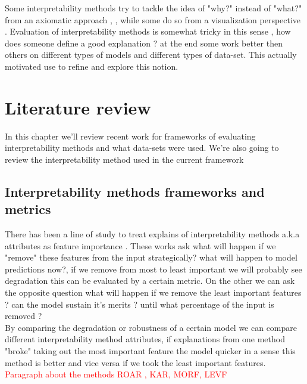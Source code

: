 \documentclass[12pt]{report}
\begin{document}
Some interpretability methods try to tackle the idea of "why?" instead of "what?" from an axiomatic approach 
\cite{DBLP:journals/corr/SundararajanTY17}, \cite{DBLP:journals/corr/abs-2111-07668},  while some do so
from a visualization perspective \cite{DBLP:journals/corr/abs-1802-00614}. Evaluation of interpretability methods is somewhat tricky in this sense , how does someone define a good explanation ? at the end some work better then others on different types of models and different types of data-set. This actually motivated use to refine and explore this notion.  


\newpage

\chapter{Literature review} 

In this chapter we'll review recent work for frameworks of evaluating interpretability methods and what data-sets were used. We're also going to review the interpretability method used in the current framework

\section{Interpretability methods frameworks and metrics}

There has been a line of study to treat explains of interpretability methods a.k.a attributes as feature importance \cite{https://doi.org/10.48550/arxiv.1509.06321} \cite{https://doi.org/10.48550/arxiv.1806.10758}.  These works ask what will happen if we "remove" these features from the input strategically?  what will happen to model predictions now?, if we remove from most to least important we will probably see degradation this can be evaluated by a certain metric. On the other we can ask the opposite question what will happen if we remove the least important features ? can the model sustain it's merits ? until what percentage of the input is removed ? \\

By comparing the degradation or robustness of a certain model we can compare different interpretability method attributes, if explanations from one method "broke" taking out the most important feature the model quicker in a sense this method is better and vice versa if we took the least important features.\\


\textcolor{red}{Paragraph about the methods ROAR , KAR, MORF, LEVF} \\
\end{document}
